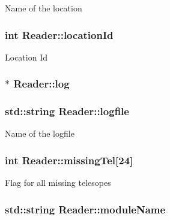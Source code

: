 Name of the location \hypertarget{classReader_a2f8737a95888b1cb41b2fa191382fe1c}{
\subsubsection[{location\-Id}]{\setlength{\rightskip}{0pt plus 5cm}int Reader\-::location\-Id\hspace{0.3cm}{\ttfamily [private]}}}\label{classReader_a2f8737a95888b1cb41b2fa191382fe1c}
Location Id \hypertarget{classReader_a3623b291506e1e6f54b90e00eeefdad8}{
\subsubsection[{log}]{$\ast$ Reader\-::log\hspace{0.3cm}{\ttfamily [private]}}}\label{classReader_a3623b291506e1e6f54b90e00eeefdad8}
\hypertarget{classReader_a59413e43dd39a74095478580bdcc7eb9}{
\subsubsection[{logfile}]{\setlength{\rightskip}{0pt plus 5cm}std\-::string Reader\-::logfile\hspace{0.3cm}{\ttfamily [private]}}}\label{classReader_a59413e43dd39a74095478580bdcc7eb9}
Name of the logfile \hypertarget{classReader_a9574d13bbda6fd1a17f1aca61e2a0df1}{
\subsubsection[{missing\-Tel}]{\setlength{\rightskip}{0pt plus 5cm}int Reader\-::missing\-Tel\mbox{[}24\mbox{]}\hspace{0.3cm}{\ttfamily [private]}}}\label{classReader_a9574d13bbda6fd1a17f1aca61e2a0df1}
Flag for all missing telesopes \hypertarget{classReader_a0120f495d8251090cb5a406b6326c543}{
\subsubsection[{module\-Name}]{\setlength{\rightskip}{0pt plus 5cm}std\-::string Reader\-::module\-Name\hspace{0.3cm}{\ttfamily [private]}}}\label{classReader_a0120f495d8251090cb5a406b6326c543}
